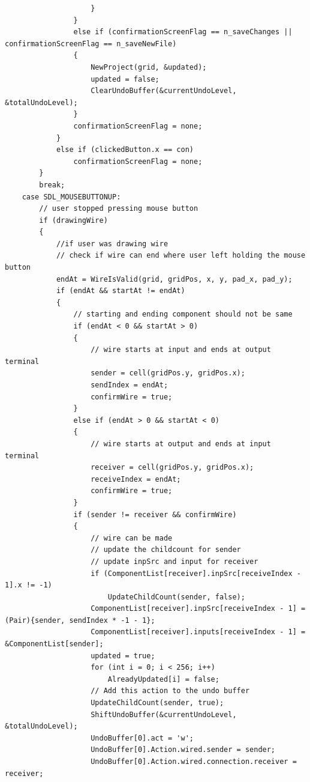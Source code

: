 \documentclass[report]{subfiles}
\begin{document}
\begin{lstlisting}
                    }
                }
                else if (confirmationScreenFlag == n_saveChanges || confirmationScreenFlag == n_saveNewFile)
                {
                    NewProject(grid, &updated);
                    updated = false;
                    ClearUndoBuffer(&currentUndoLevel, &totalUndoLevel);
                }
                confirmationScreenFlag = none;
            }
            else if (clickedButton.x == con)
                confirmationScreenFlag = none;
        }
        break;
    case SDL_MOUSEBUTTONUP:
        // user stopped pressing mouse button
        if (drawingWire)
        {
            //if user was drawing wire 
            // check if wire can end where user left holding the mouse button
            endAt = WireIsValid(grid, gridPos, x, y, pad_x, pad_y);
            if (endAt && startAt != endAt)
            {
                // starting and ending component should not be same
                if (endAt < 0 && startAt > 0)
                {
                    // wire starts at input and ends at output terminal
                    sender = cell(gridPos.y, gridPos.x);
                    sendIndex = endAt;
                    confirmWire = true;
                }
                else if (endAt > 0 && startAt < 0)
                {
                    // wire starts at output and ends at input terminal
                    receiver = cell(gridPos.y, gridPos.x);
                    receiveIndex = endAt;
                    confirmWire = true;
                }
                if (sender != receiver && confirmWire)
                {
                    // wire can be made
                    // update the childcount for sender
                    // update inpSrc and input for receiver
                    if (ComponentList[receiver].inpSrc[receiveIndex - 1].x != -1)
                        UpdateChildCount(sender, false);
                    ComponentList[receiver].inpSrc[receiveIndex - 1] = (Pair){sender, sendIndex * -1 - 1};
                    ComponentList[receiver].inputs[receiveIndex - 1] = &ComponentList[sender];
                    updated = true;
                    for (int i = 0; i < 256; i++)
                        AlreadyUpdated[i] = false;
                    // Add this action to the undo buffer
                    UpdateChildCount(sender, true);
                    ShiftUndoBuffer(&currentUndoLevel, &totalUndoLevel);
                    UndoBuffer[0].act = 'w';
                    UndoBuffer[0].Action.wired.sender = sender;
                    UndoBuffer[0].Action.wired.connection.receiver = receiver;

\end{lstlisting}
\end{document}
